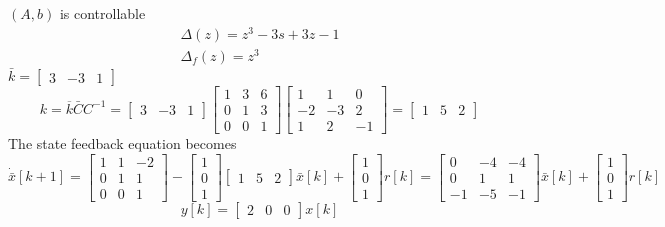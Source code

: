 \documentclass{article}
\begin{document}
$(A, b)$ is controllable
$$
\begin{array}{l}
\Delta(z)=z^{3}-3 s+3 z-1 \\
\Delta_{f}(z)=z^{3}
\end{array}
$$
$\bar{k}=\left[\begin{array}{lll}3 & -3 & 1\end{array}\right]$
$$
k=\overline{k}\bar{C} C^{-1} =\left[\begin{array}{lll}
3 & -3 & 1
\end{array}\right]\left[\begin{array}{ccc}
1 & 3 & 6 \\
0 & 1 & 3 \\
0 & 0 & 1
\end{array}\right]\left[\begin{array}{ccc}
1 & 1 & 0 \\
-2 & -3 & 2 \\
1 & 2 & -1
\end{array}\right]=\left[\begin{array}{lll}
1 & 5 & 2
\end{array}\right]
$$
The state feedback equation becomes
$$
\dot{\bar{x}}[k+1]=\left[\begin{array}{ccc}
1 & 1 & -2 \\
0 & 1 & 1 \\
0 & 0 & 1
\end{array}\right]-\left[\begin{array}{l}
1 \\
0 \\
1
\end{array}\right]\left[\begin{array}{lll}
1 & 5 & 2
\end{array}\right] \bar{x}[k]+\left[\begin{array}{l}
1 \\
0 \\
1
\end{array}\right] r[k]=\left[\begin{array}{ccc}
0 & -4 & -4 \\
0 & 1 & 1 \\
-1 & -5 & -1
\end{array}\right] \bar{x}[k]+\left[\begin{array}{l}
1 \\
0 \\
1
\end{array}\right] r[k]
$$
$$y[k]=\left[\begin{array}{lll}2 & 0 & 0\end{array}\right] x[k]$$
\end{document}

